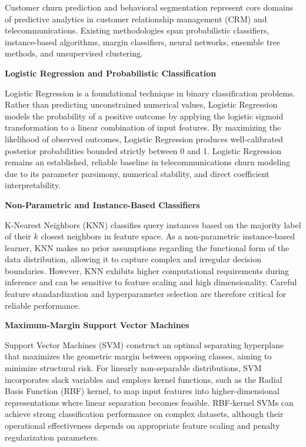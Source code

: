 \documentclass[12pt,oneside]{report}
\begin{document}
Customer churn prediction and behavioral segmentation represent core domains of predictive analytics in customer relationship management (CRM) and telecommunications. Existing methodologies span probabilistic classifiers, instance-based algorithms, margin classifiers, neural networks, ensemble tree methods, and unsupervised clustering.

\textbf{Logistic Regression and Probabilistic Classification}

Logistic Regression is a foundational technique in binary classification problems. Rather than predicting unconstrained numerical values, Logistic Regression models the probability of a positive outcome by applying the logistic sigmoid transformation to a linear combination of input features. By maximizing the likelihood of observed outcomes, Logistic Regression produces well-calibrated posterior probabilities bounded strictly between 0 and 1. Logistic Regression remains an established, reliable baseline in telecommunications churn modeling due to its parameter parsimony, numerical stability, and direct coefficient interpretability.

\textbf{Non-Parametric and Instance-Based Classifiers}

K-Nearest Neighbors (KNN) classifies query instances based on the majority label of their $k$ closest neighbors in feature space. As a non-parametric instance-based learner, KNN makes no prior assumptions regarding the functional form of the data distribution, allowing it to capture complex and irregular decision boundaries. However, KNN exhibits higher computational requirements during inference and can be sensitive to feature scaling and high dimensionality. Careful feature standardization and hyperparameter selection are therefore critical for reliable performance.

\textbf{Maximum-Margin Support Vector Machines}

Support Vector Machines (SVM) construct an optimal separating hyperplane that maximizes the geometric margin between opposing classes, aiming to minimize structural risk. For linearly non-separable distributions, SVM incorporates slack variables and employs kernel functions, such as the Radial Basis Function (RBF) kernel, to map input features into higher-dimensional representations where linear separation becomes feasible. RBF-kernel SVMs can achieve strong classification performance on complex datasets, although their operational effectiveness depends on appropriate feature scaling and penalty regularization parameters.
\end{document}
